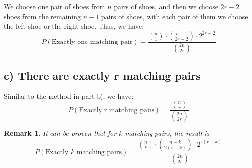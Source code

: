 \documentclass[a4paper, UTF-8]{article}
\theoremstyle{plain}
\newtheorem{remark}{\indent Remark}[section]
\begin{document}
We choose one pair of shoes from $n$ pairs of shoes, and then we choose $2r-2$ shoes from the remaining $n-1$ pairs of shoes, with each pair of them we choose the left shoe or the right shoe. Thus, we have:
$$
P(\text{Exactly one matching pair}) = \frac{\binom{n}{1} \cdot \binom{n-1}{2r-2} \cdot 2^{2r-2}}{\binom{2n}{2r}}
$$

\subsection{c) There are exactly r matching pairs}

Similar to the method in part b), we have:
$$
P(\text{Exactly r matching pairs}) = \frac{\binom{n}{r}}{\binom{2n}{2r}}
$$

\begin{remark} 
It can be proven that for $k$ matching pairs, the result is 
$$
P(\text{Exactly $k$ matching pairs}) = \frac{\binom{n}{k} \cdot \binom{n-k}{2(r-k)}\cdot 2^{2(r-k)}}{\binom{2n}{2r}}
$$
\end{remark}
\end{document}
